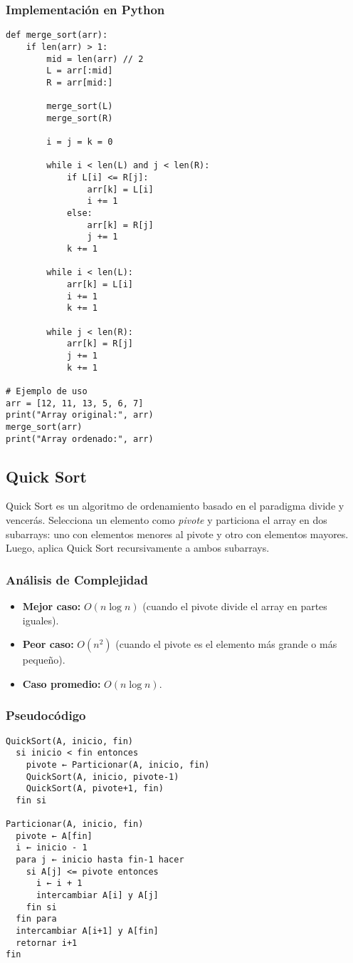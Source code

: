 \documentclass[11pt,openany]{book}
\begin{document}
\subsubsection{Implementación en Python}
\lstset{language=Python}
\begin{lstlisting}
def merge_sort(arr):
    if len(arr) > 1:
        mid = len(arr) // 2
        L = arr[:mid]
        R = arr[mid:]

        merge_sort(L)
        merge_sort(R)

        i = j = k = 0

        while i < len(L) and j < len(R):
            if L[i] <= R[j]:
                arr[k] = L[i]
                i += 1
            else:
                arr[k] = R[j]
                j += 1
            k += 1

        while i < len(L):
            arr[k] = L[i]
            i += 1
            k += 1

        while j < len(R):
            arr[k] = R[j]
            j += 1
            k += 1

# Ejemplo de uso
arr = [12, 11, 13, 5, 6, 7]
print("Array original:", arr)
merge_sort(arr)
print("Array ordenado:", arr)
\end{lstlisting}


\subsection{Quick Sort}
Quick Sort es un algoritmo de ordenamiento basado en el paradigma divide y vencerás. Selecciona un elemento como \textit{pivote} y particiona el array en dos subarrays: uno con elementos menores al pivote y otro con elementos mayores. Luego, aplica Quick Sort recursivamente a ambos subarrays.

\subsubsection{Análisis de Complejidad}
\begin{itemize}
    \item \textbf{Mejor caso:} $O(n \log n)$ (cuando el pivote divide el array en partes iguales).
    \item \textbf{Peor caso:} $O(n^2)$ (cuando el pivote es el elemento más grande o más pequeño).
    \item \textbf{Caso promedio:} $O(n \log n)$.
\end{itemize}

\subsubsection{Pseudocódigo}
\begin{verbatim}
QuickSort(A, inicio, fin)
  si inicio < fin entonces
    pivote ← Particionar(A, inicio, fin)
    QuickSort(A, inicio, pivote-1)
    QuickSort(A, pivote+1, fin)
  fin si

Particionar(A, inicio, fin)
  pivote ← A[fin]
  i ← inicio - 1
  para j ← inicio hasta fin-1 hacer
    si A[j] <= pivote entonces
      i ← i + 1
      intercambiar A[i] y A[j]
    fin si
  fin para
  intercambiar A[i+1] y A[fin]
  retornar i+1
fin
\end{verbatim}
\end{document}
